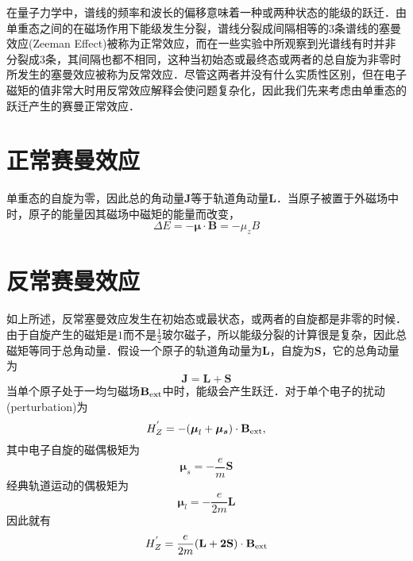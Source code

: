 

在量子力学中，谱线的频率和波长的偏移意味着一种或两种状态的能级的跃迁．由单重态之间的在磁场作用下能级发生分裂，谱线分裂成间隔相等的3条谱线的塞曼效应(Zeeman Effect)被称为正常效应，而在一些实验中所观察到光谱线有时并非分裂成3条，其间隔也都不相同，这种当初始态或最终态或两者的总自旋为非零时所发生的塞曼效应被称为反常效应．尽管这两者并没有什么实质性区别，但在电子磁矩的值非常大时用反常效应解释会使问题复杂化，因此我们先来考虑由单重态的跃迁产生的赛曼正常效应．

\section{正常赛曼效应
}
单重态的自旋为零，因此总的角动量$\mathbf{J}$等于轨道角动量$\mathbf{L}$．当原子被置于外磁场中时，原子的能量因其磁场中磁矩的能量而改变，
$$\Delta E = -\boldsymbol\mu\cdot \mathbf{B}=-\mu_z B$$
\section{反常赛曼效应}

如上所述，反常塞曼效应发生在初始态或最状态，或两者的自旋都是非零的时候．由于自旋产生的磁矩是$1$而不是$\frac{1}{2}$玻尔磁子，所以能级分裂的计算很是复杂，因此总磁矩等同于总角动量．假设一个原子的轨道角动量为$\mathbf{L}$，自旋为$\mathbf{S}$，它的总角动量为
$$\mathbf{J=L+S}$$
当单个原子处于一均匀磁场$\mathbf{B}_{\rm{ext}}$中时，能级会产生跃迁．对于单个电子的扰动(perturbation)为
$$H_Z^{'} = -(\boldsymbol{\mu}_l+\boldsymbol{\mu_s})\cdot \mathbf{B}_{\rm{ext}},$$
其中电子自旋的磁偶极矩为$$\boldsymbol\mu _s =-\frac{e}{m}\mathbf{S}$$经典轨道运动的偶极矩为
$$\boldsymbol\mu _l =-\frac{e}{2m}\mathbf{L}$$因此就有$$H_Z^{'} = \frac{e}{2m}(\mathbf{L+2S})\cdot \mathbf{B}_{\rm{ext}}$$